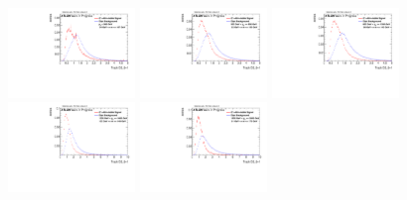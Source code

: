 \begin{figure}[H]
\bigskip
\includegraphics[width=0.3\textwidth]{sascha_input/Appendix/Distributions/higgs/distributions/beta1/h_normal_tj_D2_bin1.pdf} \hspace{1mm}
\includegraphics[width=0.3\textwidth]{sascha_input/Appendix/Distributions/higgs/distributions/beta1/h_normal_tj_D2_bin2.pdf} \hspace{4mm}
\includegraphics[width=0.3\textwidth]{sascha_input/Appendix/Distributions/higgs/distributions/beta1/h_normal_tj_D2_bin3.pdf} 
\bigskip
\includegraphics[width=0.3\textwidth]{sascha_input/Appendix/Distributions/higgs/distributions/beta1/h_normal_tj_D2_bin4.pdf} \hspace{4mm}
\includegraphics[width=0.3\textwidth]{sascha_input/Appendix/Distributions/higgs/distributions/beta1/h_normal_tj_D2_bin5.pdf} 


\end{figure}

